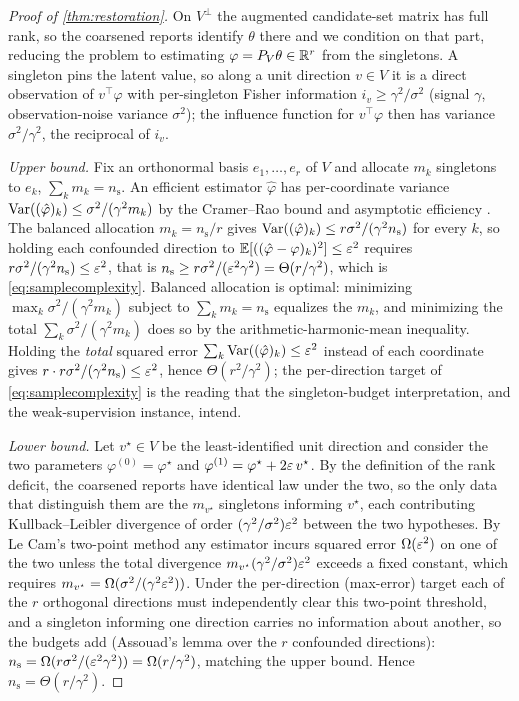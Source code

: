 \begin{proof}[Proof of \cref{thm:restoration}]
On $V^\perp$ the augmented candidate-set matrix has full rank, so the coarsened
reports identify $\theta$ there and we condition on that part, reducing the problem
to estimating $\varphi = P_V \theta \in \mathbb{R}^r$ from the singletons. A singleton pins
the latent value, so along a unit direction $v \in V$ it is a direct observation of
$v^\top \varphi$ with per-singleton Fisher information $i_v \ge \gamma^2/\sigma^2$
(signal $\gamma$, observation-noise variance $\sigma^2$); the influence function
for $v^\top \varphi$ then has variance $\sigma^2/\gamma^2$, the reciprocal of
$i_v$.

\emph{Upper bound.} Fix an orthonormal basis $e_1, \ldots, e_r$ of $V$ and allocate
$m_k$ singletons to $e_k$, $\sum_k m_k = n_{\mathrm{s}}$. An efficient estimator
$\hat\varphi$ has per-coordinate variance $\operatorname{Var}((\hat\varphi)_k) \le \sigma^2 /
(\gamma^2 m_k)$ by the Cramer--Rao bound and asymptotic efficiency
\citep[Ch.~8]{vandervaart1998asymptotic}. The balanced allocation $m_k =
n_{\mathrm{s}}/r$ gives $\operatorname{Var}((\hat\varphi)_k) \le r \sigma^2 / (\gamma^2
n_{\mathrm{s}})$ for every $k$, so holding each confounded direction to
$\mathbb{E}[((\hat\varphi - \varphi)_k)^2] \le \varepsilon^2$ requires $r \sigma^2 / (\gamma^2
n_{\mathrm{s}}) \le \varepsilon^2$, that is $n_{\mathrm{s}} \ge r \sigma^2 / (\varepsilon^2
\gamma^2) = \Theta(r/\gamma^2)$, which is \eqref{eq:samplecomplexity}. Balanced
allocation is optimal: minimizing $\max_k \sigma^2/(\gamma^2 m_k)$ subject to $\sum_k
m_k = n_{\mathrm{s}}$ equalizes the $m_k$, and minimizing the total $\sum_k
\sigma^2/(\gamma^2 m_k)$ does so by the arithmetic-harmonic-mean inequality. Holding
the \emph{total} squared error $\sum_k \operatorname{Var}((\hat\varphi)_k) \le \varepsilon^2$ instead of
each coordinate gives $r \cdot r\sigma^2/(\gamma^2 n_{\mathrm{s}}) \le \varepsilon^2$, hence
$\Theta(r^2/\gamma^2)$; the per-direction target of \eqref{eq:samplecomplexity} is
the reading that the singleton-budget interpretation, and the weak-supervision
instance, intend.

\emph{Lower bound.} Let $v^\star \in V$ be the least-identified unit direction and
consider the two parameters $\varphi^{(0)} = \varphi^\star$ and $\varphi^{(1)} =
\varphi^\star + 2\varepsilon\, v^\star$. By the definition of the rank deficit, the
coarsened reports have identical law under the two, so the only data that
distinguish them are the $m_{v^\star}$ singletons informing $v^\star$, each
contributing Kullback--Leibler divergence of order $(\gamma^2/\sigma^2)\varepsilon^2$
between the two hypotheses. By Le Cam's two-point method
\citep{tsybakov2009introduction} any estimator incurs
squared error $\Omega(\varepsilon^2)$ on one of the two unless the total divergence
$m_{v^\star}(\gamma^2/\sigma^2)\varepsilon^2$ exceeds a fixed constant, which requires
$m_{v^\star} = \Omega(\sigma^2/(\gamma^2 \varepsilon^2))$. Under the per-direction
(max-error) target each of the $r$ orthogonal directions must independently clear
this two-point threshold, and a singleton informing one direction carries no
information about another, so the budgets add (Assouad's lemma over the $r$
confounded directions): $n_{\mathrm{s}} = \Omega(r \sigma^2 /
(\varepsilon^2 \gamma^2)) = \Omega(r/\gamma^2)$, matching the upper bound. Hence
$n_{\mathrm{s}} = \Theta(r/\gamma^2)$.
\end{proof}
